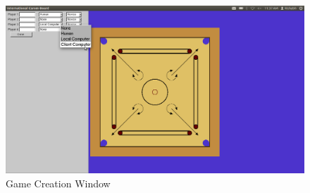 \documentclass[11pt,a4paper,oneside]{report}
\begin{document}
\begin{figure}[htp]
\centering
\includegraphics[scale=0.20]{Screenshot8}
\caption{Game Creation Window}
\label{fig:Still from game}
\end{figure}
\end{document}
